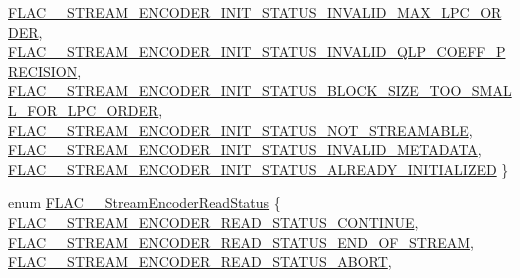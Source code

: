 \begin{DoxyCompactItemize}
\hyperlink{group__flac__stream__encoder_gga3bb869620af2b188d77982a5c30b047da38a69e94b3333e4ba779d2ff8f43f64e}{F\+L\+A\+C\+\_\+\+\_\+\+S\+T\+R\+E\+A\+M\+\_\+\+E\+N\+C\+O\+D\+E\+R\+\_\+\+I\+N\+I\+T\+\_\+\+S\+T\+A\+T\+U\+S\+\_\+\+I\+N\+V\+A\+L\+I\+D\+\_\+\+M\+A\+X\+\_\+\+L\+P\+C\+\_\+\+O\+R\+D\+ER}, 
\hyperlink{group__flac__stream__encoder_gga3bb869620af2b188d77982a5c30b047da5be80403bd7a43450139442e0f34ad7e}{F\+L\+A\+C\+\_\+\+\_\+\+S\+T\+R\+E\+A\+M\+\_\+\+E\+N\+C\+O\+D\+E\+R\+\_\+\+I\+N\+I\+T\+\_\+\+S\+T\+A\+T\+U\+S\+\_\+\+I\+N\+V\+A\+L\+I\+D\+\_\+\+Q\+L\+P\+\_\+\+C\+O\+E\+F\+F\+\_\+\+P\+R\+E\+C\+I\+S\+I\+ON}, 
\hyperlink{group__flac__stream__encoder_gga3bb869620af2b188d77982a5c30b047da62a17a3ed3c05ddf8ea7f6fecbd4e4a1}{F\+L\+A\+C\+\_\+\+\_\+\+S\+T\+R\+E\+A\+M\+\_\+\+E\+N\+C\+O\+D\+E\+R\+\_\+\+I\+N\+I\+T\+\_\+\+S\+T\+A\+T\+U\+S\+\_\+\+B\+L\+O\+C\+K\+\_\+\+S\+I\+Z\+E\+\_\+\+T\+O\+O\+\_\+\+S\+M\+A\+L\+L\+\_\+\+F\+O\+R\+\_\+\+L\+P\+C\+\_\+\+O\+R\+D\+ER}, 
\hyperlink{group__flac__stream__encoder_gga3bb869620af2b188d77982a5c30b047daa793405c858c7606539082750080a47e}{F\+L\+A\+C\+\_\+\+\_\+\+S\+T\+R\+E\+A\+M\+\_\+\+E\+N\+C\+O\+D\+E\+R\+\_\+\+I\+N\+I\+T\+\_\+\+S\+T\+A\+T\+U\+S\+\_\+\+N\+O\+T\+\_\+\+S\+T\+R\+E\+A\+M\+A\+B\+LE}, 
\newline
\hyperlink{group__flac__stream__encoder_gga3bb869620af2b188d77982a5c30b047daa85afdd1849c75a19594416cef63e3e9}{F\+L\+A\+C\+\_\+\+\_\+\+S\+T\+R\+E\+A\+M\+\_\+\+E\+N\+C\+O\+D\+E\+R\+\_\+\+I\+N\+I\+T\+\_\+\+S\+T\+A\+T\+U\+S\+\_\+\+I\+N\+V\+A\+L\+I\+D\+\_\+\+M\+E\+T\+A\+D\+A\+TA}, 
\hyperlink{group__flac__stream__encoder_gga3bb869620af2b188d77982a5c30b047dab4e7b50d176a127575df90383cb15e1d}{F\+L\+A\+C\+\_\+\+\_\+\+S\+T\+R\+E\+A\+M\+\_\+\+E\+N\+C\+O\+D\+E\+R\+\_\+\+I\+N\+I\+T\+\_\+\+S\+T\+A\+T\+U\+S\+\_\+\+A\+L\+R\+E\+A\+D\+Y\+\_\+\+I\+N\+I\+T\+I\+A\+L\+I\+Z\+ED}
 \}
\item 
enum \hyperlink{group__flac__stream__encoder_ga2e81f007fb0a7414c0bbb453f37ea37f}{F\+L\+A\+C\+\_\+\+\_\+\+Stream\+Encoder\+Read\+Status} \{ \hyperlink{group__flac__stream__encoder_gga2e81f007fb0a7414c0bbb453f37ea37fa4bdd691d3666f19ec96ff99402347a2e}{F\+L\+A\+C\+\_\+\+\_\+\+S\+T\+R\+E\+A\+M\+\_\+\+E\+N\+C\+O\+D\+E\+R\+\_\+\+R\+E\+A\+D\+\_\+\+S\+T\+A\+T\+U\+S\+\_\+\+C\+O\+N\+T\+I\+N\+UE}, 
\hyperlink{group__flac__stream__encoder_gga2e81f007fb0a7414c0bbb453f37ea37fa562fef84bf86a9a39682e23066d9cfee}{F\+L\+A\+C\+\_\+\+\_\+\+S\+T\+R\+E\+A\+M\+\_\+\+E\+N\+C\+O\+D\+E\+R\+\_\+\+R\+E\+A\+D\+\_\+\+S\+T\+A\+T\+U\+S\+\_\+\+E\+N\+D\+\_\+\+O\+F\+\_\+\+S\+T\+R\+E\+AM}, 
\hyperlink{group__flac__stream__encoder_gga2e81f007fb0a7414c0bbb453f37ea37fa69b94eeab60e07d5fd33f2b3c8b85759}{F\+L\+A\+C\+\_\+\+\_\+\+S\+T\+R\+E\+A\+M\+\_\+\+E\+N\+C\+O\+D\+E\+R\+\_\+\+R\+E\+A\+D\+\_\+\+S\+T\+A\+T\+U\+S\+\_\+\+A\+B\+O\+RT}, 

\end{DoxyCompactItemize}
